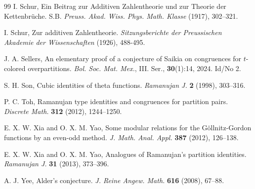 \documentclass[12pt]{amsart}
\theoremstyle{plain}
\theoremstyle{definition}
\begin{document}
\begin{thebibliography}{99}
 I. Schur, Ein Beitrag zur Additiven Zahlentheorie und zur Theorie der Kettenbr\"uche. S.B. \textit{Preuss. Akad. Wiss. Phys. Math. Klasse} (1917), 302--321.

 I. Schur, Zur additiven Zahlentheorie. \textit{Sitzungsberichte der Preussischen Akademie der Wissenschaften} (1926), 488-495.

 J. A. Sellers, An elementary proof of a conjecture of Saikia on congruences for $t$-colored overpartitions. \textit{Bol. Soc. Mat. Mex.}, III. Ser., {\bf 30}(1):14, 2024. Id/No 2.

 S. H. Son, Cubic identities of theta functions. \textit{Ramanujan J.} \textbf{2} (1998), 303--316.

 P. C. Toh, Ramanujan type identities and congruences for partition pairs. \textit{Discrete Math.} {\bf 312} (2012), 1244--1250.

 E. X. W. Xia and  O. X. M. Yao, Some modular relations for the G\"ollnitz-Gordon functions by an even-odd method. \textit{J. Math. Anal. Appl.} \textbf{387} (2012), 126--138.

 E. X. W. Xia and O. X. M. Yao, Analogues of Ramanujan's partition identities. \textit{Ramanujan J.} {\bf 31} (2013), 373--396.

 A. J. Yee, Alder's conjecture. \textit{J. Reine Angew. Math.} \textbf{616} (2008), 67--88.

\end{thebibliography}
\end{document}
